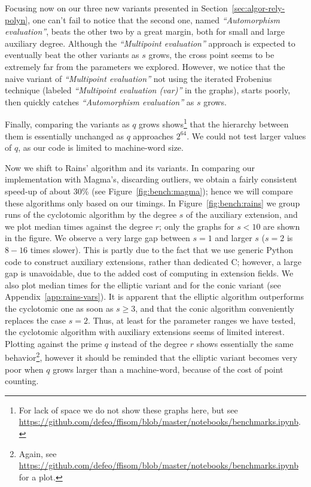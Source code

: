 Focusing now on our three new variants presented in
Section~\ref{sec:algor-rely-polyn}, one can't fail to notice that the
second one, named \emph{``Automorphism evaluation''}, beats the other
two by a great margin, both for small and large auxiliary degree. %
Although the \emph{``Multipoint evaluation''} approach is expected to
eventually beat the other variants as $s$ grows, the cross point seems
to be extremely far from the parameters we explored. %
However, we notice that the naive variant of \emph{``Multipoint
  evaluation''} not using the iterated Frobenius technique (labeled
\emph{``Multipoint evaluation (var)''} in the graphs), starts poorly,
then quickly catches \emph{``Automorphism evaluation''} as $s$ grows.

Finally, comparing the variants as $q$ grows shows\footnote{For lack
  of space we do not show these graphs here, but see
  \url{https://github.com/defeo/ffisom/blob/master/notebooks/benchmarks.ipynb}.}
that the hierarchy between them is essentially unchanged as $q$
approaches $2^{64}$. %
We could not test larger values of $q$, as our code is limited to
machine-word size.

Now we shift to Rains' algorithm and its variants. %
In comparing our implementation with Magma's, discarding outliers, we
obtain a fairly consistent speed-up of about 30\% (see
Figure~\ref{fig:bench:magma}); hence we will compare these algorithms
only based on our timings. %
In Figure~\ref{fig:bench:rains} we group runs of the cyclotomic
algorithm by the degree $s$ of the auxiliary extension, and we plot
median times against the degree $r$; only the graphs for $s<10$ are
shown in the figure. %
We observe a very large gap between $s=1$ and larger $s$ ($s=2$ is
$8-16$ times slower). This is partly due to the fact that we use
generic Python code to construct auxiliary extensions, rather than
dedicated C; however, a large gap is unavoidable, due to the added
cost of computing in extension fields. %
We also plot median times for the elliptic variant and for the conic
variant (see Appendix~\ref{app:rains-vars}). %
It is apparent that the elliptic algorithm outperforms the cyclotomic
one as soon as $s\ge 3$, and that the conic algorithm conveniently
replaces the case $s=2$. %
Thus, at least for the parameter ranges we have tested, the cyclotomic
algorithm with auxiliary extensions seems of limited interest. %
Plotting against the prime $q$ instead of the degree $r$ shows
essentially the same behavior\footnote{Again, see
  \url{https://github.com/defeo/ffisom/blob/master/notebooks/benchmarks.ipynb}
  for a plot.}, however it should be reminded that the elliptic
variant becomes very poor when $q$ grows larger than a machine-word,
because of the cost of point counting.

